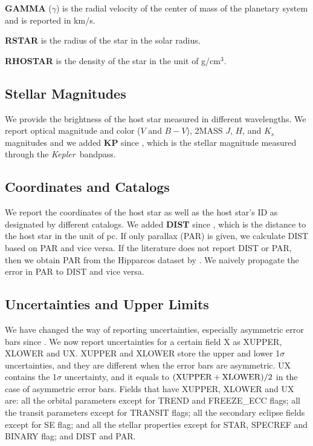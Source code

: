 \documentclass[11pt,preprint]{aastex}
\def\kepler{\textit{Kepler}}
\begin{document}
\begin{CJK*}{UTF8}{gbsn}
{\bf GAMMA} ($\gamma$) is the radial velocity of the center of mass of
the planetary system and is reported in km/s.

{\bf RSTAR} is the radius of the star in the solar radius.

{\bf RHOSTAR} is the density of the star in the unit of g/cm$^3$.

\subsection{Stellar Magnitudes}\label{sec:stellarmag}

We provide the brightness of the host star measured in different
wavelengths. We report optical magnitude and color ($V$ and $B-V$),
2MASS $J$, $H$, and $K_s$ magnitudes and we added {\bf KP} since
\cite{Wright2011}, which is the stellar magnitude measured through the
\kepler\ bandpass.


\subsection{Coordinates and Catalogs}\label{sec:coord}

We report the coordinates of the host star as well as the host star's
ID as designated by different catalogs.  We added {\bf DIST} since
\cite{Wright2011}, which is the distance to the host star in the unit
of pc. If only parallax (PAR) is given, we calculate DIST based on PAR
and vice versa. If the literature does not report DIST or PAR, then we
obtain PAR from the Hipparcos dataset by \cite{van Leeuwen2009}. We
naively propagate the error in PAR to DIST and vice versa.

\subsection{Uncertainties and Upper Limits}\label{sec:unc}

We have changed the way of reporting uncertainties, especially
asymmetric error bars since \cite{Wright2011}. We now report
uncertainties for a certain field X as XUPPER, XLOWER and UX. XUPPER
and XLOWER store the upper and lower 1$\sigma$ uncertainties, and they
are different when the error bars are asymmetric. UX contains the
1$\sigma$ uncertainty, and it equals to $({\rm XUPPER+XLOWER})/2$ in
the case of asymmetric error bars. Fields that have XUPPER, XLOWER and
UX are: all the orbital parameters except for TREND and FREEZE\_ECC
flags; all the transit parameters except for TRANSIT flags; all the
secondary eclipse fields except for SE flag; and all the stellar
properties except for STAR, SPECREF and BINARY flag; and DIST and PAR.


\end{CJK*}
\end{document}

